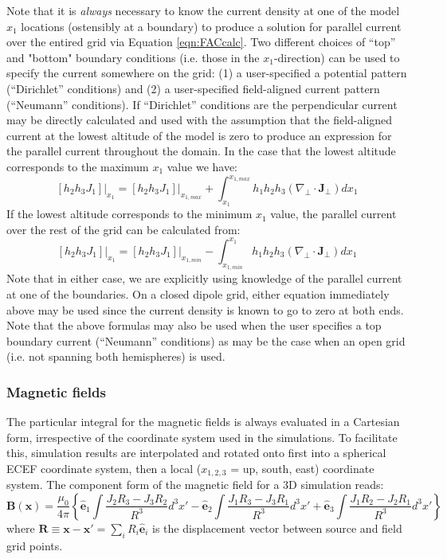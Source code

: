\documentclass[11pt,letterpaper]{article}
\begin{document}
Note that it is \emph{always} necessary to know the current density at one of the model $x_1$ locations (ostensibly at a boundary) to produce a solution for parallel current over the entired grid via Equation \ref{eqn:FACcalc}.  Two different choices of ``top'' and "bottom" boundary conditions (i.e. those in the $x_1$-direction) can be used to specify the current somewhere on the grid:  (1) a user-specified a potential pattern (``Dirichlet'' conditions) and (2) a user-specified field-aligned current pattern (``Neumann'' conditions).  If ``Dirichlet'' conditions are the perpendicular current may be directly calculated and used with the assumption that the field-aligned current at the lowest altitude of the model is zero to produce an expression for the parallel current throughout the domain.  In the case that the lowest altitude corresponds to the maximum $x_1$ value we have:
\begin{equation}
\left. \left[ h_2 h_3 J_1 \right] \right|_{x_1} = \left. \left[ h_2 h_3 J_1 \right] \right|_{x_{1,max}} + \int_{x_1}^{x_{1,max}} h_1 h_2 h_3 \left( \nabla_\perp \cdot \mathbf{J}_\perp \right) d x_1
\end{equation}
If the lowest altitude corresponds to the minimum $x_1$ value, the parallel current over the rest of the grid can be calculated from:
\begin{equation}
\left. \left[ h_2 h_3 J_1 \right] \right|_{x_1} = \left. \left[ h_2 h_3 J_1 \right] \right|_{x_{1,min}} - \int_{x_{1,min}}^{x_1} h_1 h_2 h_3 \left( \nabla_\perp \cdot \mathbf{J}_\perp \right) d x_1
\end{equation}
Note that in either case, we are explicitly using knowledge of the parallel current at one of the boundaries.  On a closed dipole grid, either equation immediately above may be used since the current density is known to go to zero at both ends.  Note that the above formulas may also be used when the user specifies a top boundary current (``Neumann'' conditions) as may be the case when an open grid (i.e. not spanning both hemispheres) is used.  


\subsubsection{Magnetic fields}

The particular integral for the magnetic fields is always evaluated in a Cartesian form, irrespective of the coordinate system used in the simulations.  To facilitate this, simulation results are interpolated and rotated onto first into a spherical ECEF coordinate system, then a local ($x_{1,2,3}$ = up, south, east) coordinate system.  The component form of the magnetic field for a 3D simulation reads:
\begin{equation}
\mathbf{B}(\mathbf{x}) = \frac{\mu_0}{4 \pi} \left\{  \hat{\mathbf{e}}_1 \int \frac{J_2 R_3 - J_3 R_2}{R^3} d^3 x' - \hat{\mathbf{e}}_2 \int \frac{J_1 R_3 - J_3 R_1}{R^3} d^3 x' + \hat{\mathbf{e}}_3 \int \frac{J_1 R_2 - J_2 R_1}{R^3} d^3 x' \right\} \label{eqn:magint3D}
\end{equation}
where $\mathbf{R} \equiv \mathbf{x}-\mathbf{x'} = \sum_i R_i \hat{\mathbf{e}}_i$ is the displacement vector between source and field grid points.  
\end{document}
